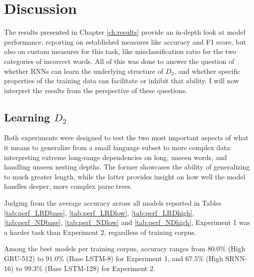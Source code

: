 \section{Discussion}\label{ch:discussion}
The results presented in Chapter \ref{ch:results} provide an in-depth look at model performance, reporting on established measures like accuracy and F1 score, but also on custom measures for this task, like misclassification ratio for the two categories of incorrect words. All of this was done to answer the question of whether RNNs can learn the underlying structure of $D_{2}$, and whether specific properties of the training data can facilitate or inhibit that ability. I will now interpret the results from the perspective of these questions.

\subsection{Learning $D_{2}$}
Both experiments were designed to test the two most important aspects of what it means to generalize from a small language subset to more complex data: interpreting extreme long-range dependencies on long, unseen words, and handling unseen nesting depths. The former showcases the ability of generalizing to much greater length, while the latter provides insight on how well the model handles deeper, more complex parse trees.

Judging from the average accuracy across all models reported in Tables \ref{tab:perf_LRDbase}, \ref{tab:perf_LRDlow}, \ref{tab:perf_LRDhigh}, \ref{tab:perf_NDbase}, \ref{tab:perf_NDlow} and \ref{tab:perf_NDhigh}, Experiment 1 was a harder task than Experiment 2, regardless of training corpus. 

Among the best models per training corpus, accuracy ranges from  $80.0\%$ (High GRU-512) to $91.0\%$ (Base LSTM-8) for Experiment 1, and $67.5\%$ (High SRNN-16) to $99.3\%$ (Base LSTM-128) for Experiment 2.

